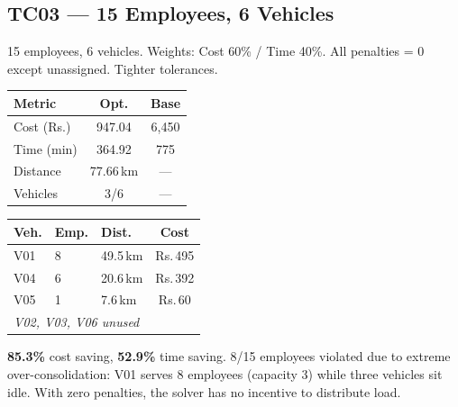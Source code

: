 \documentclass[11pt,a4paper]{article}
\newcommand{\rupee}{Rs.}
\newcommand{\saving}[1]{\textcolor{velgreen}{\textbf{#1}}}
\begin{document}
\subsection{TC03 --- 15 Employees, 6 Vehicles}

\begin{instancebox}
15 employees, 6 vehicles. Weights: Cost 60\% / Time 40\%. All penalties = 0 except unassigned. Tighter tolerances.
\end{instancebox}

\begin{minipage}[t]{0.47\textwidth}
\begin{table}[H]
\centering
\small
\begin{tabular}{lcc}
\toprule
\textbf{Metric} & \textbf{Opt.} & \textbf{Base} \\
\midrule
\rowcolor{rowalt}
Cost (\rupee) & 947.04 & 6,450 \\
Time (min) & 364.92 & 775 \\
\rowcolor{rowalt}
Distance & 77.66\,km & --- \\
Vehicles & 3/6 & --- \\
\bottomrule
\end{tabular}
\end{table}
\end{minipage}
\hfill
\begin{minipage}[t]{0.50\textwidth}
\begin{table}[H]
\centering
\small
\begin{tabular}{lllc}
\toprule
\textbf{Veh.} & \textbf{Emp.} & \textbf{Dist.} & \textbf{Cost} \\
\midrule
\rowcolor{rowalt}
V01 & 8 & 49.5\,km & \rupee\,495 \\
V04 & 6 & 20.6\,km & \rupee\,392 \\
\rowcolor{rowalt}
V05 & 1 & 7.6\,km & \rupee\,60 \\
\multicolumn{4}{l}{\textit{V02, V03, V06 unused}} \\
\bottomrule
\end{tabular}
\end{table}
\end{minipage}

\saving{85.3\%} cost saving, \saving{52.9\%} time saving. 8/15 employees violated due to extreme over-consolidation: V01 serves 8 employees (capacity 3) while three vehicles sit idle. With zero penalties, the solver has no incentive to distribute load.
\end{document}
